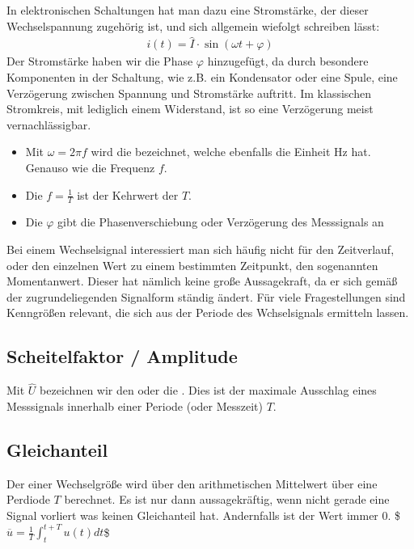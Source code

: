 \documentclass[letterpaper,10pt,english]{jupyterBook}
\begin{document}
\sphinxAtStartPar
In elektronischen Schaltungen hat man dazu eine Stromstärke, der dieser Wechselspannung zugehörig ist, und sich allgemein wiefolgt schreiben lässt:
\begin{equation*}
\begin{split}i(t) = \hat I \cdot \sin(\omega t + \varphi)\end{split}
\end{equation*}
\sphinxAtStartPar
Der Stromstärke haben wir die Phase \(\varphi\) hinzugefügt, da durch besondere Komponenten in der Schaltung, wie z.B. ein Kondensator oder eine Spule, eine Verzögerung zwischen Spannung und Stromstärke auftritt. Im klassischen Stromkreis, mit lediglich einem Widerstand, ist so eine Verzögerung meist vernachlässigbar.
\begin{itemize}
\item {} 
\sphinxAtStartPar
Mit \(\omega = 2\pi f\) wird die  bezeichnet, welche ebenfalls die Einheit Hz hat. Genauso wie die Frequenz \(f\).

\item {} 
\sphinxAtStartPar
Die  \(f = \frac{1}{T}\) ist der Kehrwert der  \(T\).

\item {} 
\sphinxAtStartPar
Die  \(\varphi\) gibt die Phasenverschiebung oder Verzögerung des Messsignals an

\end{itemize}

\sphinxAtStartPar
Bei einem Wechselsignal interessiert man sich häufig nicht für den Zeitverlauf, oder den einzelnen Wert zu einem bestimmten Zeitpunkt, den sogenannten Momentanwert. Dieser hat nämlich keine große Aussagekraft, da er sich gemäß der zugrundeliegenden Signalform ständig ändert. Für viele Fragestellungen sind Kenngrößen relevant, die sich aus der Periode des Wchselsignals ermitteln lassen.


\subsection{Scheitelfaktor / Amplitude}
\label{\detokenize{content/3_Kenngroessen:scheitelfaktor-amplitude}}
\sphinxAtStartPar
Mit \(\hat U\) bezeichnen wir den  oder die . Dies ist der maximale Ausschlag eines Messsignals innerhalb einer Periode (oder Messzeit) \(T\).


\subsection{Gleichanteil}
\label{\detokenize{content/3_Kenngroessen:gleichanteil}}
\sphinxAtStartPar
Der  einer Wechselgröße wird über den arithmetischen Mittelwert über eine Perdiode \(T\) berechnet. Es ist nur dann aussagekräftig, wenn nicht gerade eine Signal vorliert was keinen Gleichanteil hat. Andernfalls ist der Wert immer 0.
\$\(\overline u = \frac{1}{T}\int_{t}^{t+T} u(t)dt\)\$
\end{document}
